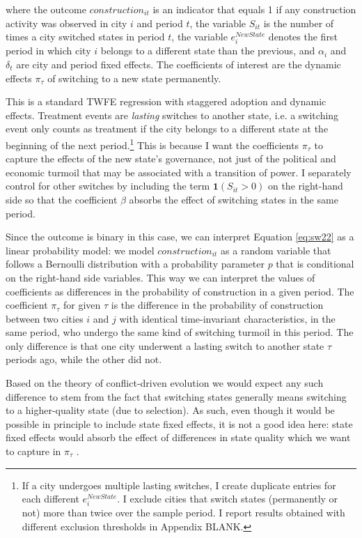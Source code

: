 \documentclass[11pt, a4paper]{article}
\begin{document}
where the outcome $construction_{it}$ is an indicator that equals 1 if any construction activity was observed in city $i$ and period $t$, the variable $S_{it}$ is the number of times a city switched states in period $t$, the variable $e^{NewState}_i$ denotes the first period in which city $i$ belongs to a different state than the previous, and $\alpha_i$ and $\delta_t$ are city and period fixed effects. The coefficients of interest are the dynamic effects $\pi_\tau$ of switching to a new state permanently. 

This is a standard TWFE regression with staggered adoption and dynamic effects. Treatment events are \textit{lasting} switches to another state, i.e. a switching event only counts as treatment if the city belongs to a different state at the beginning of the next period.\footnote
{
    If a city undergoes multiple lasting switches, I create duplicate entries for each different $e^{NewState}_i$. I exclude cities that switch states (permanently or not) more than twice over the sample period. I report results obtained with different exclusion thresholds in Appendix BLANK.
}
This is because I want the coefficients $\pi_\tau$ to capture the effects of the new state's governance, not just of the political and economic turmoil that may be associated with a transition of power. I separately control for other switches by including the term $\mathbf{1}(S_{it} > 0)$ on the right-hand side so that the coefficient $\beta$ absorbs the effect of switching states in the same period.

Since the outcome is binary in this case, we can interpret Equation \eqref{eq:sw22} as a linear probability model: we model $construction_{it}$ as a random variable that follows a Bernoulli distribution with a probability parameter $p$ that is conditional on the right-hand side variables. This way we can interpret the values of coefficients as differences in the probability of construction in a given period. The coefficient $\pi_\tau$ for given $\tau$ is the difference in the probability of construction between two cities $i$ and $j$ with identical time-invariant characteristics, in the same period, who undergo the same kind of switching turmoil in this period. The only difference is that one city underwent a lasting switch to another state $\tau$ periods ago, while the other did not. 


Based on the theory of conflict-driven evolution we would expect any such difference to stem from the fact that switching states generally means switching to a higher-quality state (due to selection). As such, even though it would be possible in principle to include state fixed effects, it is not a good idea here: state fixed effects would absorb the effect of differences in state quality which we want to capture in $\pi_\tau$ \citep[p. 13]{schoenholzer2022}.
\end{document}
